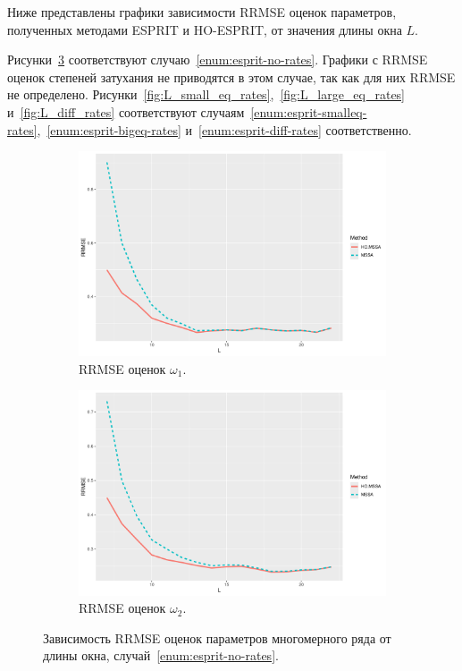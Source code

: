 \documentclass[specialist,
  substylefile=spbu_report.rtx,
subf,href,colorlinks=true, 12pt]{disser}
\theoremstyle{plain}
\theoremstyle{definition}
\theoremstyle{remark}
\begin{document}
Ниже представлены графики зависимости RRMSE оценок параметров,
полученных методами ESPRIT и HO-ESPRIT, от значения длины окна $L$.

Рисунки~\ref{fig:L_no_rates} соответствуют случаю~\ref{enum:esprit-no-rates}.
Графики с RRMSE оценок степеней затухания не приводятся в этом
случае, так как для них RRMSE не определено.
Рисунки~\ref{fig:L_small_eq_rates},~\ref{fig:L_large_eq_rates}
и~\ref{fig:L_diff_rates}
соответствуют
случаям~\ref{enum:esprit-smalleq-rates},~\ref{enum:esprit-bigeq-rates}
и~\ref{enum:esprit-diff-rates}
соответственно.
\begin{figure}[!ht]
  \centering
  \begin{subfigure}{0.49\linewidth}
    \includegraphics[width=\linewidth]{freq1_L_no_rates.pdf}
    \caption{RRMSE оценок $\omega_1$.}
    \label{fig:freq1_L_no_rates}
  \end{subfigure}
  \begin{subfigure}{0.49\linewidth}
    \includegraphics[width=\linewidth]{freq2_L_no_rates.pdf}
    \caption{RRMSE оценок $\omega_2$.}
    \label{fig:freq2_L_no_rates}
  \end{subfigure}
  \caption{Зависимость RRMSE оценок параметров многомерного ряда от
    длины окна,
  случай~\ref{enum:esprit-no-rates}.}
  \label{fig:L_no_rates}
\end{figure}
\end{document}

